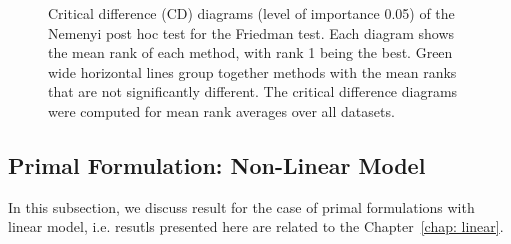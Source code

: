 \begin{figure}[!p]
  \centering
  
  \caption{Critical difference (CD) diagrams (level of importance 0.05) of the Nemenyi post hoc test for the Friedman test. Each diagram shows the mean rank of each method, with rank 1 being the best. Green wide horizontal lines group together methods with the mean ranks that are not significantly different. The critical difference diagrams were computed for mean rank averages over all datasets.}
  \label{fig: critical diagrams dual gauss}
\end{figure}

\newpage

\subsection{Primal Formulation: Non-Linear Model}

In this subsection, we discuss result for the case of primal formulations with linear model, i.e. resutls presented here are related to the Chapter~\ref{chap: linear}.

